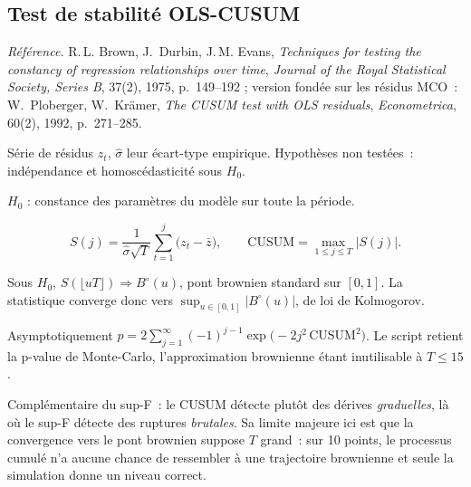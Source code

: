 \documentclass[a4paper,11pt]{article}
\newcommand{\refl}[1]{{\small\textcolor{maincolor!70!black}{\textit{Référence.} #1}}\par\smallskip}
\newcounter{ficheid}
\newenvironment{fiche}[1]{%
  \stepcounter{ficheid}%
  \phantomsection
  \subsection{#1}%
  \label{fiche:\theficheid}%
}{%
  \end{description}\vspace{0.5em}%
}
\newcommand{\Cadre}{%
  \begin{description}[leftmargin=0pt, style=unboxed, itemsep=3pt, topsep=3pt, parsep=2pt]%
  \item[\textcolor{financeblue}{\textbf{1. Cadre, notations et hypothèses de validité (non testées).}}]}
\newcommand{\Hzero}{\item[\textcolor{financeblue}{\textbf{2. Hypothèse nulle.}}]}
\newcommand{\Stat}{\item[\textcolor{financeblue}{\textbf{3. Statistique de test.}}]}
\newcommand{\Loi}{\item[\textcolor{financeblue}{\textbf{4. Loi sous $H_0$.}}]}
\newcommand{\Pval}{\item[\textcolor{financeblue}{\textbf{5. p-value.}}]}
\newcommand{\Usage}{\item[\textcolor{financeblue}{\textbf{6. Usage et limites.}}]}
\begin{document}
\begin{fiche}{Test de stabilité OLS-CUSUM}
\refl{R.\,L. Brown, J.~Durbin, J.\,M. Evans, \emph{Techniques for testing the constancy of
regression relationships over time}, \emph{Journal of the Royal Statistical Society, Series B},
37(2), 1975, p.~149--192 ; version fondée sur les résidus MCO~: W.~Ploberger, W.~Krämer,
\emph{The CUSUM test with OLS residuals}, \emph{Econometrica}, 60(2), 1992, p.~271--285.}
\Cadre
Série de résidus $z_t$, $\hat\sigma$ leur écart-type empirique. Hypothèses non testées~:
indépendance et homoscédasticité sous $H_0$.
\Hzero
$H_0$ : constance des paramètres du modèle sur toute la période.
\Stat
\[
  S(j) = \frac{1}{\hat\sigma\sqrt{T}}\sum_{t=1}^{j}\big(z_t - \bar z\big),
  \qquad
  \mathrm{CUSUM} = \max_{1\le j\le T}\big|S(j)\big| .
\]
\Loi
Sous $H_0$, $S(\lfloor uT \rfloor) \Rightarrow B^{\circ}(u)$, pont brownien standard sur $[0,1]$.
La statistique converge donc vers $\sup_{u\in[0,1]}|B^\circ(u)|$, de loi de Kolmogorov.
\Pval
Asymptotiquement
$p = 2\sum_{j=1}^{\infty}(-1)^{j-1}\exp\!\big(-2j^2\,\mathrm{CUSUM}^2\big)$.
Le script retient la p-value de Monte-Carlo, l'approximation brownienne étant inutilisable à
$T \le 15$.
\Usage
Complémentaire du sup-F~: le CUSUM détecte plutôt des dérives \emph{graduelles}, là où le sup-F
détecte des ruptures \emph{brutales}. Sa limite majeure ici est que la convergence vers le pont
brownien suppose $T$ grand~: sur 10 points, le processus cumulé n'a aucune chance de ressembler à
une trajectoire brownienne et seule la simulation donne un niveau correct.
\end{fiche}
\end{document}
